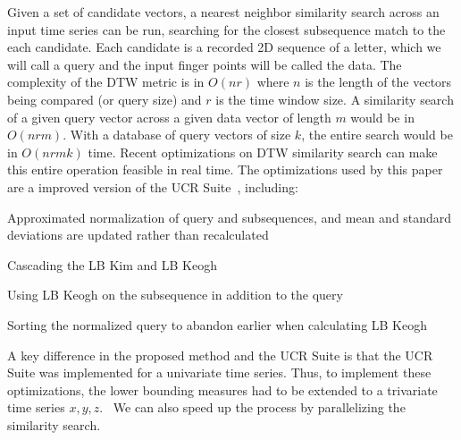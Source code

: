 Given a set of candidate vectors, a nearest neighbor similarity search across an input time series can be run, searching for the closest subsequence match to the each candidate. Each candidate is a recorded 2D sequence of a letter, which we will call a query and the input finger points will be called the data.
The complexity of the DTW metric is in $O(nr)$ where $n$ is the length of the vectors being compared (or query size) and $r$ is the time window size. A similarity search of a given query vector across a given data vector of length $m$ would be in $O(nrm)$. With a database of query vectors of size $k$, the entire search would be in $O(nrmk)$ time.
Recent optimizations on DTW similarity search can make this entire operation feasible in real time. The optimizations used by this paper are a improved version of the UCR Suite~\cite{rakthanmanon2012searching}, including:
\begin{enumerate*}
\item
Approximated normalization of query and subsequences, and mean and standard deviations are updated rather than recalculated
\item
Cascading the LB Kim and LB Keogh
\item
Using LB Keogh on the subsequence in addition to the query
\item
Sorting the normalized query to abandon earlier when calculating LB Keogh
\end{enumerate*}
A key difference in the proposed method and the UCR Suite is that the UCR Suite was implemented for a univariate time series. Thus, to implement these optimizations, the lower bounding measures had to be extended to a trivariate time series ${x,y,z}$.~\cite{rath2002lower-bounding}
We can also speed up the process by parallelizing the similarity search.
